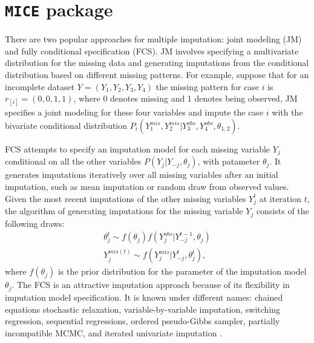 	\section{\texttt{MICE} package}
	\label{sec:6.3}
	There are two popular approaches for multiple imputation: joint modeling (JM) and fully conditional specification (FCS). JM involves specifying a multivariate distribution for the missing data and generating imputations from the conditional distribution based on different missing patterns. For example, suppose that for an incomplete dataset $Y = (Y_1, Y_2, Y_3, Y_4)$ the missing pattern for case $i$ is $r_{[i]} = (0, 0, 1, 1)$, where 0 denotes missing and 1 denotes being observed, JM specifies a joint modeling for these four variables and impute the case $i$ with the bivariate conditional distribution $P_{i}(Y_1^{mis}, Y_2^{mis} | Y_3^{obs}, Y_4^{obs}, \theta_{1,2})$. 
	
	FCS attempts to specify an imputation model for each missing variable $Y_j$ conditional on all the other variables $P(Y_j | Y_{-j}, \theta_{j})$, with patameter $\theta_{j}$. It generates imputations iteratively over all missing variables after an initial imputation, such as mean imputation or random draw from observed values. Given the most recent imputations of the other missing variables $Y_{j}^{t}$ at iteration $t$, the algorithm of generating imputations for the missing variable $Y_{j}$ consists of the following draws:
	\begin{align*}
		\theta_{j}^{t} \sim f(\theta_{j})f(Y_{j}^{obs}|Y_{-j}^{t-1}, \theta_{j})\\
		Y_{j}^{mis(t)} \sim f(Y_{j}^{mis}|Y_{-j}^{t}, \theta_{j}^{t}),
	\end{align*}
	where $f(\theta_{j})$ is the prior distribution for the parameter of the imputation model $\theta_{j}$.
	The FCS is an attractive imputation approach because of its flexibility in imputation model specification. It is known under different names: chained equations stochastic relaxation, variable-by-variable imputation, switching regression, sequential regressions, ordered pseudo-Gibbs sampler, partially incompatible MCMC, and iterated univariate imputation \citep{van2007multiple}. 
	

